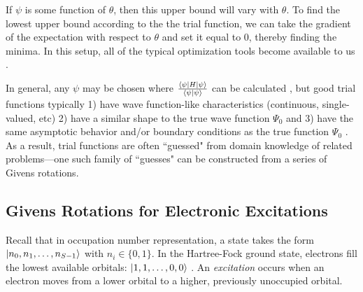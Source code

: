 \documentclass[11pt]{article}
\begin{document}
If $\psi$ is some function of $\theta$, then this upper bound will vary with $\theta$. To find the lowest upper bound according to the the trial function, we can take the gradient of the expectation with respect to $\theta$ and set it equal to $0$, thereby finding the minima. In this setup, all of the typical optimization tools become available to us \cite{Berekely}.

In general, any $\psi$ may be chosen where $\frac{\braket{\psi|H|\psi}}{\braket{\psi|\psi}}$ can be calculated\footnotemark{} \cite{Berekely}, but good trial functions typically 1) have wave function-like characteristics (continuous, single-valued, etc) 2) have a similar shape to the true wave function $\Psi_0$ and 3) have the same asymptotic behavior and/or boundary conditions as the true function $\Psi_0$ \cite{LibreChem}. As a result, trial functions are often ``guessed" from domain knowledge of related problems---one such family of ``guesses" can be constructed from a series of Givens rotations.


\subsection{Givens Rotations for Electronic Excitations}
Recall that in occupation number representation, a state takes the form $\ket{n_0, n_1, \dots, n_{S-1}}$ with $n_i \in \{0, 1 \}$. In the Hartree-Fock ground state, electrons fill the lowest available orbitals: $\ket{1, 1, \dots, 0, 0}$ \cite{Oslo, Givens}. An \emph{excitation} occurs when an electron moves from a lower orbital to a higher, previously unoccupied orbital. 
\end{document}
